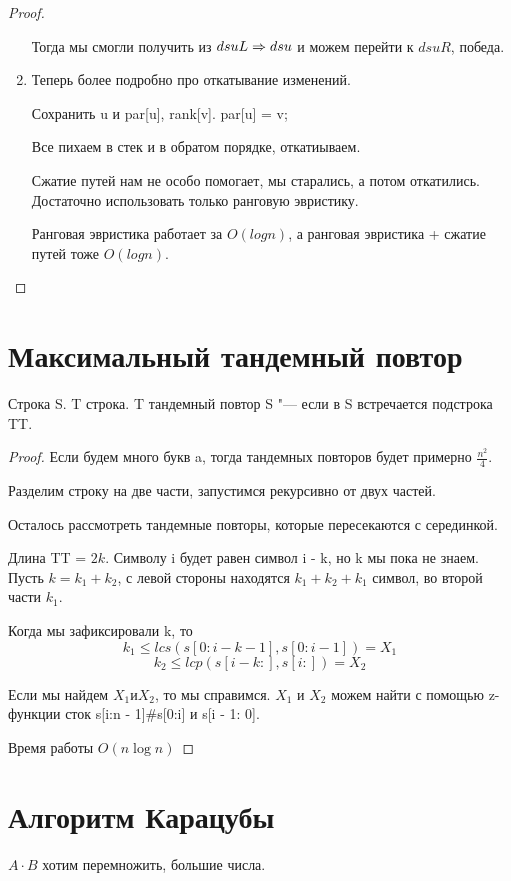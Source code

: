 \begin{proof}
\begin{enumerate}
Тогда мы смогли получить из $dsuL \Rightarrow dsu$ и можем перейти к $dsuR$, победа. 

\item Теперь более подробно про откатывание изменений. 

Сохранить u и par[u], rank[v].
par[u] = v;

Все пихаем в стек и в обратом порядке, откатиываем.

Сжатие путей нам не особо помогает, мы старались, а потом откатились.
Достаточно использовать только ранговую эвристику. 

Ранговая эвристика работает за $O(log n)$, а ранговая эвристика + сжатие путей тоже $O(log n)$.

\end{enumerate}
\end{proof}

\section{Максимальный тандемный повтор}
\begin{Def}
Строка S.
T строка.
T тандемный повтор S "--- если в S встречается подстрока TT.
\end{Def}

\begin{proof}
Если будем много букв a, тогда тандемных повторов будет примерно $\frac{n^2}{4}$.

Разделим строку на две части, запустимся рекурсивно от двух частей. 

Осталось рассмотреть тандемные повторы, которые пересекаются с серединкой. 

Длина TT = $2k$. Символу i будет равен символ i - k, но k мы пока не знаем.
Пусть $k = k_1 + k_2$, с левой стороны находятся $k_1 + k_2 + k_1$ символ, во второй части $k_1$.

Когда мы зафиксировали k, то 
$$k_1 \le lcs(s[0:i - k - 1], s[0:i - 1]) = X_1$$ 
$$k_2 \le lcp(s[i - k:], s[i:]) = X_2$$

Если мы найдем $X_1 и X_2$, то мы справимся. $X_1$ и $X_2$ можем найти
 с помощью z-функции сток s[i:n - 1]\#s[0:i] и s[i - 1: 0].

Время работы $O(n \log n)$
\end{proof}
\section{Алгоритм Карацубы}
$A \cdot B$ хотим перемножить, большие числа.

